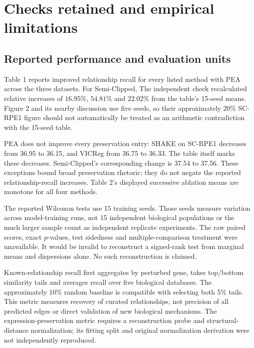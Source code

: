 \documentclass[10pt]{article}
\begin{document}
\section*{Checks retained and empirical limitations}
\subsection*{Reported performance and evaluation units}
Table 1 reports improved relationship recall for every listed method with PEA across the three datasets. For Semi-Clipped, The independent check recalculated relative increases of \(16.95\%\), \(54.81\%\) and \(22.02\%\) from the table’s 15-seed means. Figure 2 and its nearby discussion use five seeds, so their approximately 20\% SC-RPE1 figure should not automatically be treated as an arithmetic contradiction with the 15-seed table.\par
PEA does not improve every preservation entry: SHAKE on SC-RPE1 decreases from 36.95 to 36.15, and VICReg from 36.75 to 36.33. The table itself marks these decreases. Semi-Clipped’s corresponding change is 37.54 to 37.56. These exceptions bound broad preservation rhetoric; they do not negate the reported relationship-recall increases. Table 2’s displayed successive ablation means are monotone for all four methods.\par
The reported Wilcoxon tests use 15 training seeds. Those seeds measure variation across model-training runs, not 15 independent biological populations or the much larger sample count as independent replicate experiments. The raw paired scores, exact \(p\)-values, test sidedness and multiple-comparison treatment were unavailable. It would be invalid to reconstruct a signed-rank test from marginal means and dispersions alone. No such reconstruction is claimed.\par
Known-relationship recall first aggregates by perturbed gene, takes top/bottom similarity tails and averages recall over five biological databases. The approximately 10\% random baseline is compatible with selecting both 5\% tails. This metric measures recovery of curated relationships, not precision of all predicted edges or direct validation of new biological mechanisms. The expression-preservation metric requires a reconstruction probe and structural-distance normalization; its fitting split and original normalization derivation were not independently reproduced.\par
\end{document}
